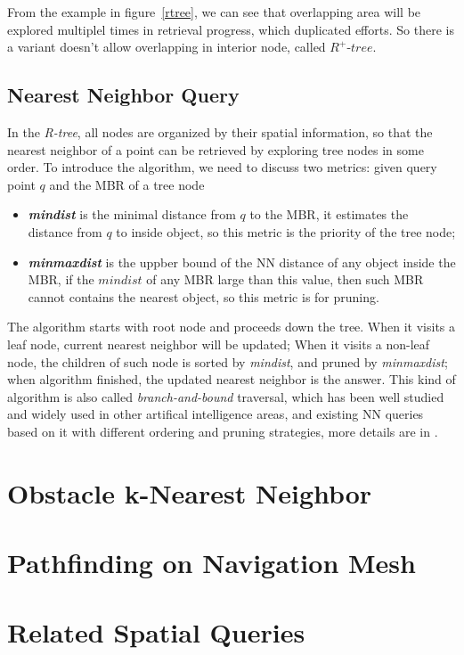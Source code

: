 From the example in figure~\ref{rtree}, we can see that overlapping area will be explored
multiplel times in retrieval progress, which duplicated efforts.
So there is a variant doesn't allow overlapping in interior node, called $R^+\textit{-tree}$\cite{sellis1987r+}.

\subsection{Nearest Neighbor Query}
In the \textit{R-tree}, all nodes are organized by their spatial information,
so that the nearest neighbor of a point can be retrieved by exploring tree nodes in some order.
To introduce the algorithm, we need to discuss two metrics: given query point $q$ and the MBR of a tree node
\begin{itemize}
  \item \textit{\textbf{mindist}} is the minimal distance from $q$ to the MBR, it estimates the
    distance from $q$ to inside object, so this metric is the priority of the tree node;
  \item \textit{\textbf{minmaxdist}} is the uppber bound of the NN distance of any object inside
    the MBR, if the $mindist$ of any MBR large than this value, then such MBR cannot contains
    the nearest object, so this metric is for pruning.
\end{itemize}
The algorithm starts with root node and proceeds down the tree. When it visits a leaf node,
current nearest neighbor will be updated;
When it visits a non-leaf node, the children of such node is sorted by \textit{mindist}, and pruned by
\textit{minmaxdist}; when algorithm finished, the updated nearest neighbor is the answer.  
This kind of algorithm is also called \textit{branch-and-bound} traversal, which has been well
studied and widely used in other artifical intelligence areas\cite{sellis1987r+},
and existing NN queries based on it with different ordering and pruning strategies,
more details are in \cite{roussopoulos1995nearest,cheung1998enhanced}.

\section{Obstacle k-Nearest Neighbor}\label{lrknn}
\section{Pathfinding on Navigation Mesh}\label{lrnav}
\section{Related Spatial Queries}\label{lrquery}
